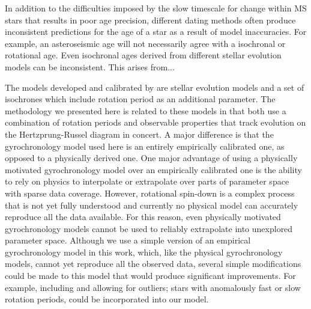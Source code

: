 In addition to the difficulties imposed by the slow timescale for change
within MS stars that results in poor age precision, different dating methods
often produce inconsistent predictions for the age of a star as a result of
model inaccuracies.
For example, an asteroseismic age will not necessarily agree with a isochronal
or rotational age.
Even isochronal ages derived from different stellar evolution models can be
inconsistent.
This arises from...




The models developed and calibrated by \citet{epstein2014, vansaders2015,
vansaders2016} are stellar evolution models and a set of isochrones  which
include rotation period as an additional parameter.
The methodology we presented here is related to these models in that both use
a combination of rotation periods and observable properties that track
evolution on the Hertzprung-Russel diagram in concert.
A major difference is that the gyrochronology model used here is an entirely
empirically calibrated one, as opposed to a physically derived one.
One major advantage of using a physically motivated gyrochronology model over
an empirically calibrated one is the ability to rely on physics to interpolate
or extrapolate over parts of parameter space with sparse data coverage.
However, rotational spin-down is a complex process that is not yet fully
understood and currently no physical model can accurately reproduce all the
data available.
For this reason, even physically motivated gyrochronology models cannot be
used to reliably extrapolate into unexplored parameter space.
Although we use a simple version of an empirical gyrochronology model in this
work, which, like the physical gyrochronology models, cannot yet reproduce all
the observed data, several simple modifications could be made to this model
that would produce significant improvements.
For example, including and allowing for outliers; stars with anomalously fast
or slow rotation periods, could be incorporated into our model.

